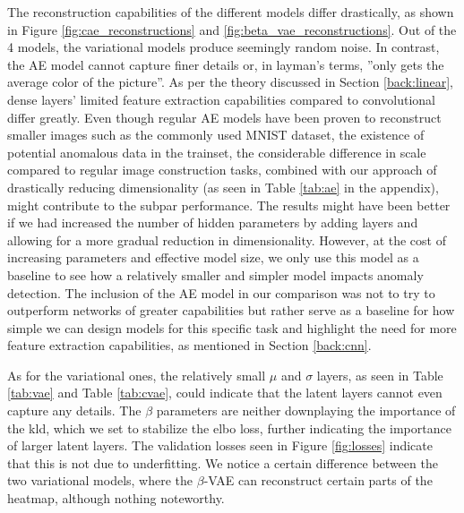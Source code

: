 The reconstruction capabilities of the different models differ drastically, as shown in Figure \ref{fig:cae_reconstructions} and \ref{fig:beta_vae_reconstructions}. Out of the 4 models, the variational models produce seemingly random noise. In contrast, the AE model cannot capture finer details or, in layman's terms, ''only gets the average color of the picture''. As per the theory discussed in Section \ref{back:linear}, dense layers' limited feature extraction capabilities compared to convolutional differ greatly. Even though regular AE models have been proven to reconstruct smaller images such as the commonly used MNIST dataset, the existence of potential anomalous data in the trainset, the considerable difference in scale compared to regular image construction tasks, combined with our approach of drastically reducing dimensionality (as seen in Table \ref{tab:ae} in the appendix), might contribute to the subpar performance. The results might have been better if we had increased the number of hidden parameters by adding layers and allowing for a more gradual reduction in dimensionality. However, at the cost of increasing parameters and effective model size, we only use this model as a baseline to see how a relatively smaller and simpler model impacts anomaly detection. The inclusion of the AE model in our comparison was not to try to outperform networks of greater capabilities but rather serve as a baseline for how simple we can design models for this specific task and highlight the need for more feature extraction capabilities, as mentioned in Section \ref{back:cnn}.

As for the variational ones, the relatively small $\mu$ and $\sigma$ layers, as seen in Table \ref{tab:vae} and Table \ref{tab:cvae}, could indicate that the latent layers cannot even capture any details. The $\beta$ parameters are neither downplaying the importance of the \acrshort{kld}, which we set to stabilize the \acrshort{elbo} loss, further indicating the importance of larger latent layers. The validation losses seen in Figure \ref{fig:losses} indicate that this is not due to underfitting. We notice a certain difference between the two variational models, where the $\beta$-VAE can reconstruct certain parts of the heatmap, although nothing noteworthy. 

